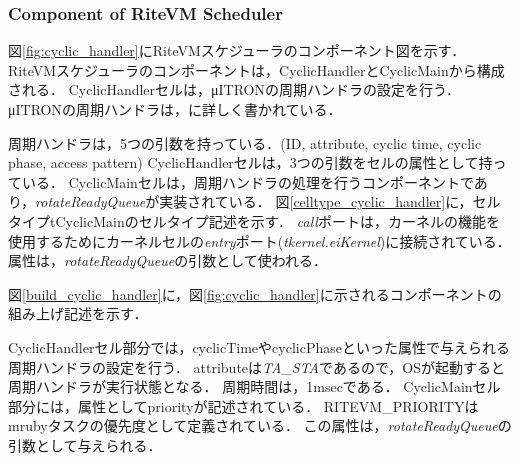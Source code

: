 \documentclass[submit]{ipsj_v2/UTF8/ipsj}
\begin{document}
\subsubsection{Component of RiteVM Scheduler}
図\ref{fig:cyclic_handler}にRiteVMスケジューラのコンポーネント図を示す．
RiteVMスケジューラのコンポーネントは，CyclicHandlerとCyclicMainから構成される．
CyclicHandlerセルは，μITRONの周期ハンドラの設定を行う．
μITRONの周期ハンドラは，\cite{par:microITRON}に詳しく書かれている．

周期ハンドラは，5つの引数を持っている．(ID, attribute, cyclic time, cyclic phase, access pattern)
CyclicHandlerセルは，3つの引数をセルの属性として持っている．
CyclicMainセルは，周期ハンドラの処理を行うコンポーネントであり，{\it rotateReadyQueue}が実装されている．
図\ref{celltype_cyclic_handler}に，セルタイプtCyclicMainのセルタイプ記述を示す．
{\it call}ポートは，カーネルの機能を使用するためにカーネルセルの{\it entry}ポート({\it tkernel.eiKernel})に接続されている．
属性は，{\it rotateReadyQueue}の引数として使われる．

図\ref{build_cyclic_handler}に，図\ref{fig:cyclic_handler}に示されるコンポーネントの組み上げ記述を示す．

CyclicHandlerセル部分では，cyclicTimeやcyclicPhaseといった属性で与えられる周期ハンドラの設定を行う．
attributeは{\it TA\_STA}であるので，OSが起動すると周期ハンドラが実行状態となる．
周期時間は，1msecである．
CyclicMainセル部分には，属性としてpriorityが記述されている．
RITEVM\_PRIORITYはmrubyタスクの優先度として定義されている．
この属性は，{\it rotateReadyQueue}の引数として与えられる．
\end{document}
